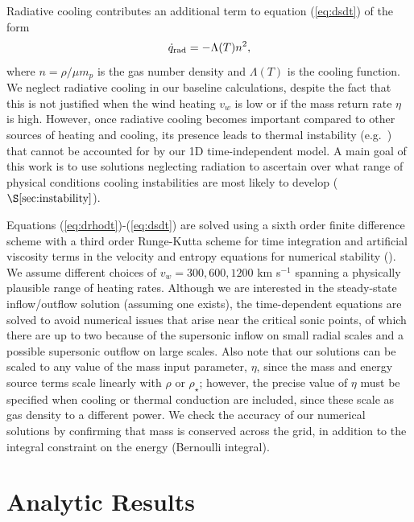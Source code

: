 \documentclass[usenatbib,fleqn]{mn2e}
\newcommand{\vwO}{v_{w}}
\begin{document}
Radiative cooling contributes an additional term to equation (\ref{eq:dsdt}) of the form
\begin{equation}
\dot{q}_{\rm rad} = -\Lambda(T)n^{2},
\label{eq:qdot_rad}
\end{equation}
where $n = \rho/\mu m_p$ is the gas number density and $\Lambda(T)$ is the cooling function.  We neglect radiative cooling in our baseline calculations, despite the fact that this is not justified when the wind heating $\vwO$ is low or if the mass return rate $\eta$ is high.  However, once radiative cooling becomes important compared to other sources of heating and cooling, its presence leads to thermal instability (e.g.~\citealt{McCourt+12}) that cannot be accounted for by our 1D
time-independent model.  A main goal of this work is to use solutions neglecting radiation to ascertain over what range of physical conditions cooling instabilities are most likely to develop ($\S\ref{sec:instability}$).

Equations (\ref{eq:drhodt})-(\ref{eq:dsdt}) are solved using a sixth
order finite difference scheme with a third order Runge-Kutta scheme
for time integration and artificial viscosity terms in the velocity
and entropy equations for numerical stability
(\citealt{Brandenburg:2003a}).  We assume different
choices of $v_{w} = 300, 600, 1200$ km s$^{-1}$ spanning a
physically plausible range of heating rates.  Although we are interested in the steady-state inflow/outflow solution (assuming one exists), the time-dependent equations are solved to avoid numerical issues that arise near the critical sonic points, of which there are up to two because of the supersonic
inflow on small radial scales and a possible supersonic outflow on large scales.  Also note that our solutions can be scaled to any value of the mass input parameter, $\eta$, since the mass and energy source terms scale linearly with $\rho$ or $\rho_{\star}$; however, the precise value of $\eta$ must be specified when cooling or thermal conduction are included, since these scale as gas density to a different power.  We check the accuracy of our numerical solutions by confirming that mass is conserved across the grid, in addition to the integral constraint on the energy (Bernoulli integral). 



\section{Analytic Results}
\label{sec:results}
\end{document}
